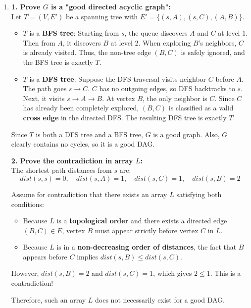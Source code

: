 \documentclass[12pt,a4paper]{article}
\makeatletter
\newtheorem*{solution}{Solution}
\theoremstyle{definition}
\renewenvironment{solution}[1][Solution] {\par\pushQED{\qed}\normalfont\topsep6\p@\@plus6\p@\relax\trivlist\item[\hskip\labelsep\bfseries#1\@addpunct{.}]\ignorespaces}{\popQED\endtrivlist\@endpefalse} \makeatother
\makeatother
\begin{document}
\begin{enumerate}
\begin{solution}
\begin{enumerate}
        \textbf{1. Prove $G$ is a "good directed acyclic graph":} \\
        Let $T = (V, E')$ be a spanning tree with $E' = \{(s, A), (s, C), (A, B)\}$. 
        \begin{itemize}
            \item $T$ is a \textbf{BFS tree}: Starting from $s$, the queue discovers $A$ and $C$ at level 1. Then from $A$, it discovers $B$ at level 2. When exploring $B$'s neighbors, $C$ is already visited. Thus, the non-tree edge $(B, C)$ is safely ignored, and the BFS tree is exactly $T$.
            \item $T$ is a \textbf{DFS tree}: Suppose the DFS traversal visits neighbor $C$ before $A$. The path goes $s \to C$. $C$ has no outgoing edges, so DFS backtracks to $s$. Next, it visits $s \to A \to B$. At vertex $B$, the only neighbor is $C$. Since $C$ has already been completely explored, $(B, C)$ is classified as a valid \textbf{cross edge} in the directed DFS. The resulting DFS tree is exactly $T$.
        \end{itemize}
        Since $T$ is both a DFS tree and a BFS tree, $G$ is a good graph. Also, $G$ clearly contains no cycles, so it is a good DAG.
        
        \textbf{2. Prove the contradiction in array $L$:} \\
        The shortest path distances from $s$ are:
        $$ dist(s, s) = 0, \quad dist(s, A) = 1, \quad dist(s, C) = 1, \quad dist(s, B) = 2 $$
        
        Assume for contradiction that there exists an array $L$ satisfying both conditions:
        \begin{itemize}
            \item Because $L$ is a \textbf{topological order} and there exists a directed edge $(B, C) \in E$, vertex $B$ must appear strictly before vertex $C$ in $L$.
            \item Because $L$ is in a \textbf{non-decreasing order of distances}, the fact that $B$ appears before $C$ implies $dist(s, B) \le dist(s, C)$.
        \end{itemize}
        However, $dist(s, B) = 2$ and $dist(s, C) = 1$, which gives $2 \le 1$. This is a contradiction!
        
        Therefore, such an array $L$ does not necessarily exist for a good DAG.
        \end{enumerate}
    \end{solution}


\end{enumerate}
\end{document}
